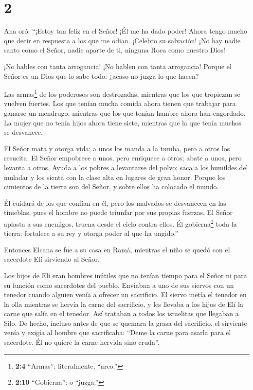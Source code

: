 \hypertarget{section-1}{%
\section{2}\label{section-1}}

 Ana oró: ``¡Estoy tan feliz en el Señor! ¡Él me ha dado
poder! Ahora tengo mucho que decir en respuesta a los que me odian.
¡Celebro su salvación!  ¡No hay nadie santo como el Señor,
nadie aparte de ti, ninguna Roca como nuestro Dios!

 ¡No hables con tanta arrogancia! ¡No hablen con tanta
arrogancia! Porque el Señor es un Dios que lo sabe todo: ¿acaso no juzga
lo que hacen?

 Las armas\footnote{\textbf{2:4} ``Armas'': literalmente,
  ``arco.''} de los poderosos son destrozadas, mientras que los que
tropiezan se vuelven fuertes.  Los que tenían mucha comida
ahora tienen que trabajar para ganarse un mendrugo, mientras que los que
tenían hambre ahora han engordado. La mujer que no tenía hijos ahora
tiene siete, mientras que la que tenía muchos se desvanece.

 El Señor mata y otorga vida; a unos los manda a la tumba,
pero a otros los resucita.  El Señor empobrece a unos, pero
enriquece a otros; abate a unos, pero levanta a otros. 
Ayuda a los pobres a levantarse del polvo; saca a los humildes del
muladar y los sienta con la clase alta en lugares de gran honor. Porque
los cimientos de la tierra son del Señor, y sobre ellos ha colocado el
mundo.

 Él cuidará de los que confían en él, pero los malvados se
desvanecen en las tinieblas, pues el hombre no puede triunfar por sus
propias fuerzas.  El Señor aplasta a sus enemigos, truena
desde el cielo contra ellos. Él gobierna\footnote{\textbf{2:10}
  ``Gobierna'': o ``juzga.''} toda la tierra; fortalece a su rey y
otorga poder al que ha ungido.''

 Entonces Elcana se fue a su casa en Ramá, mientras el niño
se quedó con el sacerdote Elí sirviendo al Señor.

 Los hijos de Elí eran hombres inútiles que no tenían
tiempo para el Señor  ni para su función como sacerdotes
del pueblo. Enviaban a uno de sus siervos con un tenedor cuando alguien
venía a ofrecer un sacrificio.  El siervo metía el tenedor
en la olla mientras se hervía la carne del sacrificio, y les llevaba a
los hijos de Elí la carne que salía en el tenedor. Así trataban a todos
los israelitas que llegaban a Silo.  De hecho, incluso
antes de que se quemara la grasa del sacrificio, el sirviente venía y
exigía al hombre que sacrificaba: ``Deme la carne para asarla para el
sacerdote. Él no quiere la carne hervida sino cruda''.


